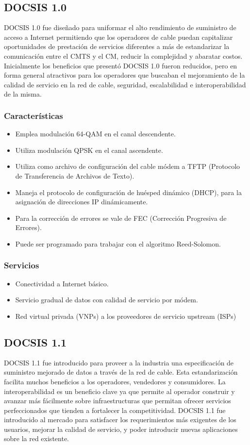 \subsection*{DOCSIS 1.0}
DOCSIS 1.0 fue diseñado para uniformar el alto rendimiento de suministro de acceso a Internet permitiendo que los operadores de cable puedan capitalizar oportunidades de prestación de servicios diferentes a más de estandarizar la comunicación entre el CMTS y el CM, reducir la complejidad y abaratar costos. Inicialmente los beneficios que presentó DOCSIS 1.0 fueron reducidos, pero en forma general atractivos para los operadores que buscaban el mejoramiento de la calidad de servicio en la red de cable, seguridad, escalabilidad e interoperabilidad de la misma.

\subsubsection*{Características}
\begin{itemize}
\item Emplea modulación 64-QAM en el canal descendente.
\item Utiliza modulación QPSK en el canal ascendente.
\item Utiliza como archivo de configuración del cable módem a TFTP (Protocolo de Transferencia de Archivos de Texto).
\item Maneja el protocolo de configuración de huésped dinámico (DHCP), para la asignación de direcciones IP dinámicamente.
\item Para la corrección de errores se vale de FEC (Corrección Progresiva de Errores).
\item Puede ser programado para trabajar con el algoritmo Reed-Solomon.
\end{itemize}
\subsubsection*{Servicios}
\begin{itemize}
\item Conectividad a Internet básico. 
\item Servicio gradual de datos con calidad de servicio por módem. 
\item Red virtual privada (VNPs) a los proveedores de servicio upstream (ISPs) 
\end{itemize}
\subsection*{DOCSIS 1.1}
DOCSIS 1.1 fue introducido para proveer a la industria una especificación de suministro mejorado de datos a través de la red de cable. Esta estandarización facilita muchos beneficios a los operadores, vendedores y consumidores. La interoperabilidad es un beneficio clave ya que permite al operador construir y avanzar más fácilmente sobre infraestructuras que permitan ofrecer servicios perfeccionados que tienden a fortalecer la competitividad. DOCSIS 1.1 fue introducido al mercado para satisfacer los requerimientos más exigentes de los usuarios, mejorar la calidad de servicio, y poder introducir nuevas aplicaciones sobre la red existente.
